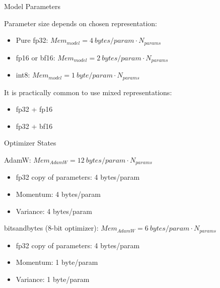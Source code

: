 
\begin{vbframe}{Model Parameters}

\vfill

Parameter size depends on chosen representation: \newline

\begin{itemize}
 	\item Pure fp32: $Mem_{model} = 4 ~bytes/param \cdot N_{params}$
 	\item fp16 or bf16: $Mem_{model} = 2 ~bytes/param \cdot N_{params}$
	\item int8: $Mem_{model} = 1 ~byte/param \cdot N_{params}$
\end{itemize}

\vskip8mm

It is practically common to use mixed representations: \newline

\begin{itemize}
 	\item fp32 + fp16
	\item fp32 + bf16
\end{itemize}

\vfill

\end{vbframe}


\begin{vbframe}{Optimizer States}

\vfill

AdamW: $Mem_{AdamW} = 12 ~bytes/param \cdot N_{params}$
\begin{itemize}
 	\item fp32 copy of parameters: 4 bytes/param
 	\item Momentum: 4 bytes/param
	\item Variance: 4 bytes/param
\end{itemize}

\vskip3mm

bitsandbytes (8-bit optimizer): $Mem_{AdamW} = 6 ~bytes/param \cdot N_{params}$
\begin{itemize}
 	\item fp32 copy of parameters: 4 bytes/param
 	\item Momentum: 1 byte/param
	\item Variance: 1 byte/param
\end{itemize}

%

\vfill

\end{vbframe}

